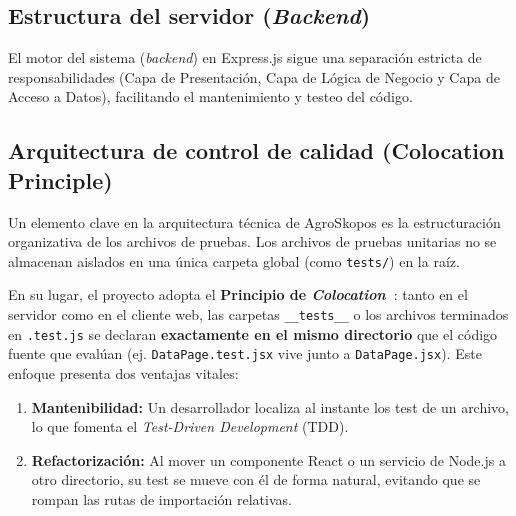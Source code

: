 \vfill
\newpage
\subsection{Estructura del servidor (\textit{Backend})}
El motor del sistema (\textit{backend}) en Express.js sigue una separación estricta de responsabilidades (Capa de Presentación, Capa de Lógica de Negocio y Capa de Acceso a Datos), facilitando el mantenimiento y testeo del código.

{\footnotesize
{}}

\subsection{Arquitectura de control de calidad (Colocation Principle)}\label{sec:colocation}
Un elemento clave en la arquitectura técnica de AgroSkopos es la estructuración organizativa de los archivos de pruebas. Los archivos de pruebas unitarias no se almacenan aislados en una única carpeta global (como \texttt{tests/}) en la raíz. 

En su lugar, el proyecto adopta el \textbf{Principio de \textit{Colocation}~\cite{colocation}}: tanto en el servidor como en el cliente web, las carpetas \texttt{\_\_tests\_\_} o los archivos terminados en \texttt{.test.js} se declaran \textbf{exactamente en el mismo directorio} que el código fuente que evalúan (ej. \texttt{DataPage.test.jsx} vive junto a \texttt{DataPage.jsx}). Este enfoque presenta dos ventajas vitales:
\begin{enumerate}
    \item \textbf{Mantenibilidad:} Un desarrollador localiza al instante los test de un archivo, lo que fomenta el \textit{Test-Driven Development} (TDD).
    \item \textbf{Refactorización:} Al mover un componente React o un servicio de Node.js a otro directorio, su test se mueve con él de forma natural, evitando que se rompan las rutas de importación relativas.
\end{enumerate}

